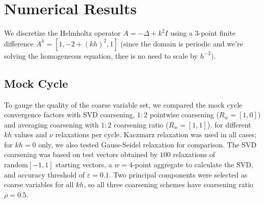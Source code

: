 \documentclass{article}
\begin{document}
\section{Numerical Results}
We discretize the Helmholtz operator $A = -\Delta + k^2 I$ using a $3$-point finite difference $A^h = [1, -2 + (kh)^2, 1]$ (since the domain is periodic and we're solving the homogeneous equation, thee is no need to scale by $h^{-2}$).

\subsection{Mock Cycle}
\label{mock_cycle}
To gauge the quality of the coarse variable set, we compared the mock cycle convergence factors with SVD coarsening, $1:2$ pointwise coarsening ($R_w = [1, 0]$) and averaging coarsening with $1:2$ coarsening ratio ($R_w = [1, 1]$). for different $kh$ values and $\nu$ relaxations per cycle. Kaczmarz relaxation was used in all cases; for $kh=0$ only, we also tested Gauss-Seidel relaxation for comparison. The SVD coarsening was based on test vectors obtained by $100$ relaxations of $\text{random}[-1,1]$ starting vectors, a $w=4$-point aggregate to calculate the SVD, and accuracy threshold of  $\varepsilon=0.1$. Two principal components were selected as coarse variables for all $kh$, so all three coarsening schemes have coarsening ratio $\rho = 0.5$.
 
\end{document}
